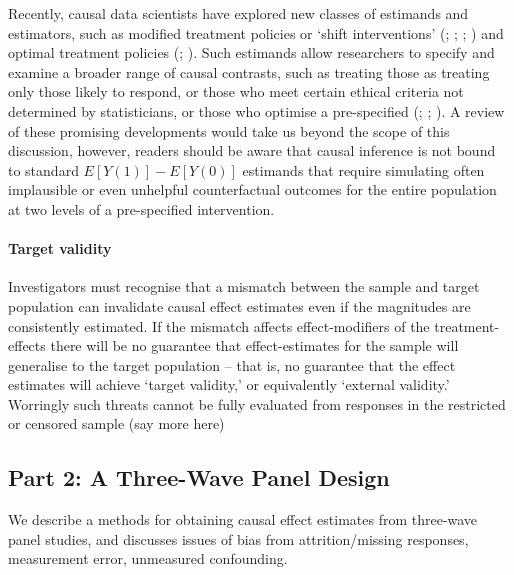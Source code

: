 \documentclass[
  singlecolumn]{article}
\let\oldparagraph\paragraph
\renewcommand{\paragraph}[1]{\oldparagraph{#1}\mbox{}}
\begin{document}
Recently, causal data scientists have explored new classes of estimands
and estimators, such as modified treatment policies or `shift
interventions' (;
;
;
) and optimal
treatment policies (;
). Such estimands
allow researchers to specify and examine a broader range of causal
contrasts, such as treating those as treating only those likely to
respond, or those who meet certain ethical criteria not determined by
statisticians, or those who optimise a pre-specified
(;
;
). A review of these
promising developments would take us beyond the scope of this
discussion, however, readers should be aware that causal inference is
not bound to standard \(E[Y(1)] - E[Y(0)]\) estimands that require
simulating often implausible or even unhelpful counterfactual outcomes
for the entire population at two levels of a pre-specified intervention.

\paragraph{Target validity}\label{target-validity}

Investigators must recognise that a mismatch between the sample and
target population can invalidate causal effect estimates even if the
magnitudes are consistently estimated. If the mismatch affects
effect-modifiers of the treatment-effects there will be no guarantee
that effect-estimates for the sample will generalise to the target
population -- that is, no guarantee that the effect estimates will
achieve `target validity,' or equivalently `external validity.'
Worringly such threats cannot be fully evaluated from responses in the
restricted or censored sample (say more here)

\subsection{Part 2: A Three-Wave Panel
Design}\label{part-2-a-three-wave-panel-design}

We describe a methods for obtaining causal effect estimates from
three-wave panel studies, and discusses issues of bias from
attrition/missing responses, measurement error, unmeasured confounding.
\end{document}
